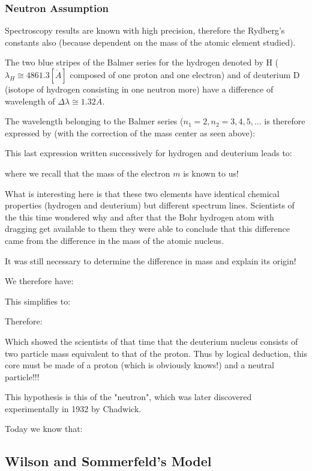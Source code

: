 	\subsubsection{Neutron Assumption}

Spectroscopy results are known with high precision, therefore the Rydberg's constants also (because dependent on the mass of the atomic element studied).

The two blue stripes of the  Balmer series for the hydrogen denoted  by H ($\lambda_H\cong 4861.3 \left[ \mathring{A} \right]$ composed of one proton and one electron) and of deuterium D (isotope of hydrogen consisting in one neutron more) have a difference of wavelength of $\Delta \lambda \cong 1.32 \mathring{A}$.

The wavelength belonging to the Balmer series ($n_1=2,n_2=3,4,5,...$ is therefore expressed by (with the correction of the mass center as seen above):
	
	This last expression written successively for hydrogen and deuterium leads to:
	
	where we recall that the mass of the electron $m$ is known to us! 
	
	What is interesting here is that these two elements have identical chemical properties (hydrogen and deuterium) but different spectrum lines. Scientists of the this time wondered why and after that the Bohr hydrogen atom with dragging get available to them they were able to conclude that this difference came from the difference in the mass of the atomic nucleus.
	
	It was still necessary to determine the difference in mass and explain its origin!
	
	We therefore have:
	
	This simplifies to:
	
	Therefore:
	
	Which showed the scientists of that time that the deuterium nucleus consists of two particle mass equivalent to that of the proton. Thus by logical deduction, this core must be made of a proton (which is obviously knows!) and a neutral particle!!!
	
	This hypothesis is this of the "neutron", which was later discovered experimentally in 1932 by Chadwick.
	
	Today we know that:
	
	
	\pagebreak	
	\subsection{Wilson and Sommerfeld's Model}
	
